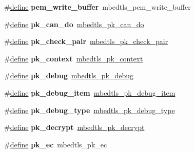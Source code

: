 \begin{DoxyCompactItemize}
\#\hyperlink{structdefine}{define} {\bfseries pem\+\_\+write\+\_\+buffer}~mbedtls\+\_\+pem\+\_\+write\+\_\+buffer
\item 
\mbox{\label{compat-1_83_8h_adb81deb436433f49f35ae15fa09e2f3a}} 
\#\hyperlink{structdefine}{define} {\bfseries pk\+\_\+can\+\_\+do}~\hyperlink{pk_8h_a2d72c66f5e78abe153bdf08874aaabf6}{mbedtls\+\_\+pk\+\_\+can\+\_\+do}
\item 
\mbox{\label{compat-1_83_8h_a789e6342771c2a7b3c3c148322e83e07}} 
\#\hyperlink{structdefine}{define} {\bfseries pk\+\_\+check\+\_\+pair}~\hyperlink{pk_8h_a87f9989d6859e2dceb5e1d4c4491fdca}{mbedtls\+\_\+pk\+\_\+check\+\_\+pair}
\item 
\mbox{\label{compat-1_83_8h_a7685372900e0ed97e1d397f5448d76d2}} 
\#\hyperlink{structdefine}{define} {\bfseries pk\+\_\+context}~\hyperlink{structmbedtls__pk__context}{mbedtls\+\_\+pk\+\_\+context}
\item 
\mbox{\label{compat-1_83_8h_a43e71399803f51bda2fffd646c6c2bca}} 
\#\hyperlink{structdefine}{define} {\bfseries pk\+\_\+debug}~\hyperlink{pk_8h_a0fb685e5a303eb149db2a61296986e14}{mbedtls\+\_\+pk\+\_\+debug}
\item 
\mbox{\label{compat-1_83_8h_aceb3d94e6271f5410cad3bd44cd751c3}} 
\#\hyperlink{structdefine}{define} {\bfseries pk\+\_\+debug\+\_\+item}~\hyperlink{structmbedtls__pk__debug__item}{mbedtls\+\_\+pk\+\_\+debug\+\_\+item}
\item 
\mbox{\label{compat-1_83_8h_aabd81e8fa72e3bc6ad88c7fd2d5daec3}} 
\#\hyperlink{structdefine}{define} {\bfseries pk\+\_\+debug\+\_\+type}~\hyperlink{pk_8h_a959c5419b3dd34df5420ee83bbc54002}{mbedtls\+\_\+pk\+\_\+debug\+\_\+type}
\item 
\mbox{\label{compat-1_83_8h_ae56d4d07f1bbf60f41ab86d2c55a5b44}} 
\#\hyperlink{structdefine}{define} {\bfseries pk\+\_\+decrypt}~\hyperlink{pk_8h_a428e2ffa53bb9bb6cf000452881682c1}{mbedtls\+\_\+pk\+\_\+decrypt}
\item 
\mbox{\label{compat-1_83_8h_a1dd04482c2172694d031370093f32cb1}} 
\#\hyperlink{structdefine}{define} {\bfseries pk\+\_\+ec}~mbedtls\+\_\+pk\+\_\+ec

\end{DoxyCompactItemize}
